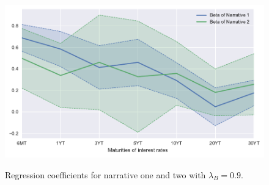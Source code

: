 \documentclass[11pt,a4paper,english,oneside]{book}
\numberwithin{equation}{chapter}
\begin{document}
\begin{figure}
	\caption{Regression coefficients for narrative one and two with $\lambda_B=0.9$.}
	\centering
	\includegraphics[scale=1]{Images/betasLamb0_9.pdf}
	\label{betaL09}
\end{figure}
\end{document}
